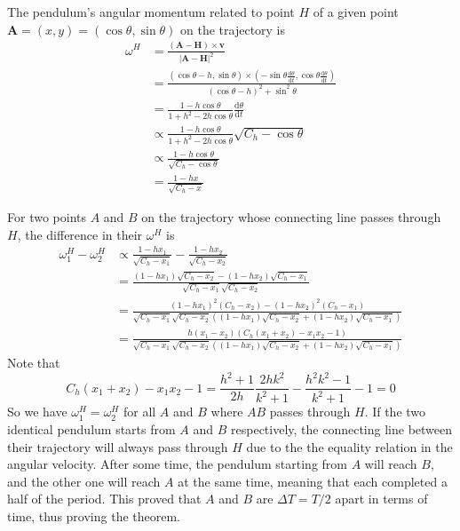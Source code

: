 \documentclass[]{article}
\newcommand{\ud}{\mathrm{d}}
\begin{document}
The pendulum's angular momentum related to point $H$ of a given point $\mathbf{A} = (x,y)=(\cos\theta,\sin\theta)$ on the trajectory is 
\begin{align*}
 \omega^H &= \frac{ (\mathbf{A}-\mathbf{H}) \times \mathbf{v} }{|\mathbf{A}-\mathbf{H}|^2}\\
 & = \frac{  (\cos\theta - h, \sin\theta) \times (-\sin\theta\frac{\ud \theta}{\ud t}, \cos\theta\frac{\ud \theta}{\ud t}) }{(\cos\theta - h)^2 + \sin^2\theta} \\
 &=\frac{1-h\cos\theta }{1 + h^2 - 2h\cos\theta} \frac{\ud \theta}{\ud t}\\
 &\propto \frac{1-h\cos\theta }{1 + h^2 - 2h\cos\theta}\sqrt{C_h - \cos\theta}\\
 &\propto \frac{1-h\cos\theta }{\sqrt{C_h - \cos\theta}}\\
 &= \frac{1-hx }{\sqrt{C_h - x}}
\end{align*}

For two points $A$ and $B$ on the trajectory whose connecting line passes through $H$, the difference in their $\omega^H$ is
\begin{align*}
\omega^H_1 - \omega^H_2 &\propto  \frac{1-hx_1 }{\sqrt{C_h - x_1}} -  \frac{1-hx_2 }{\sqrt{C_h - x_2}}\\
& =  \frac{(1-hx_1)\sqrt{C_h - x_2} - (1-hx_2)\sqrt{C_h - x_1}}{\sqrt{C_h - x_1}\sqrt{C_h - x_2}} \\
& =  \frac{(1-hx_1)^2(C_h - x_2) - (1-hx_2)^2(C_h - x_1)}{\sqrt{C_h - x_1}\sqrt{C_h - x_2}\left((1-hx_1)\sqrt{C_h - x_2} + (1-hx_2)\sqrt{C_h - x_1}\right)}\\
& =  \frac{h(x_1-x_2)(C_h(x_1+x_2)-x_1x_2-1)}{\sqrt{C_h - x_1}\sqrt{C_h - x_2}\left((1-hx_1)\sqrt{C_h - x_2} + (1-hx_2)\sqrt{C_h - x_1}\right)}
\end{align*}
Note that
\[
C_h(x_1+x_2)-x_1x_2-1 = \frac{h^2+1}{2h} \frac{2hk^2}{k^2+1} - \frac{h^2k^2-1}{k^2+1} - 1 = 0
\]
So we have $\omega^H_1 = \omega^H_2$ for all $A$ and $B$ where $AB$ passes through $H$. If the two identical pendulum starts from $A$ and $B$ respectively, the connecting line between their trajectory will always pass through $H$ due to the the equality relation in the angular velocity. After some time, the pendulum starting from $A$ will reach $B$, and the other one will reach $A$ at the same time, meaning that each completed a half of the period. This proved that $A$ and $B$ are $\Delta T = T/2$ apart in terms of time, thus proving the theorem.
 
\end{document}
